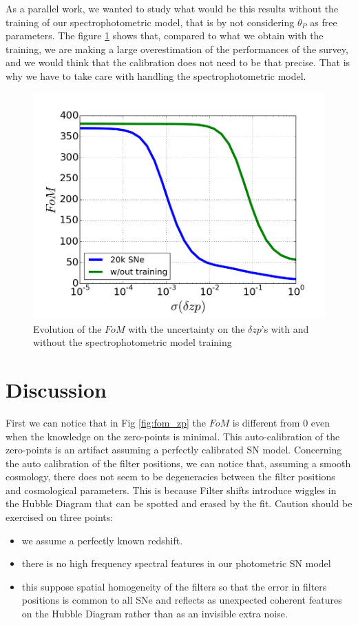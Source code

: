 \documentclass[\docopts]{\docclass}
\begin{document}
As a parallel work, we wanted to study what would be this results without the training of our spectrophotometric model, that is by not considering $\theta_P$ as free parameters.
The figure \ref{fig:fom_wout_training} shows that, compared to what we obtain with the training, we are making a large overestimation of the performances of the survey, and we would think that the calibration does not need to be that precise. That is why we have to take care with handling the spectrophotometric model.
\begin{figure}[ht]
  \centering
  \includegraphics[width=\linewidth]{FoM_20k+training.png}
  \caption{Evolution of the $FoM$ with the uncertainty on the $\delta zp$'s with and without the spectrophotometric model training}
  \label{fig:fom_wout_training}
\end{figure}


\section{Discussion}
\label{sec::discussion}
First we can notice that in Fig \ref{fig:fom_zp} the $FoM$ is different from 0 even when the knowledge on the zero-points is minimal.
This auto-calibration of the zero-points is an artifact assuming a perfectly calibrated SN model.
Concerning the auto calibration of the filter positions, we can notice that, assuming a smooth cosmology, there does not seem to be degeneracies between the filter positions and cosmological parameters.
This is because Filter shifts introduce wiggles in the Hubble Diagram that can be spotted and erased by the fit.
Caution should be exercised on three points:
\begin{itemize}
\item we assume a perfectly known redshift.
\item there is no high frequency spectral features in our photometric SN model
\item this suppose spatial homogeneity of the filters so that the error in filters positions is common to all SNe and reflects as unexpected coherent features on the Hubble Diagram rather than as an invisible extra noise.
\end{itemize}
\end{document}
